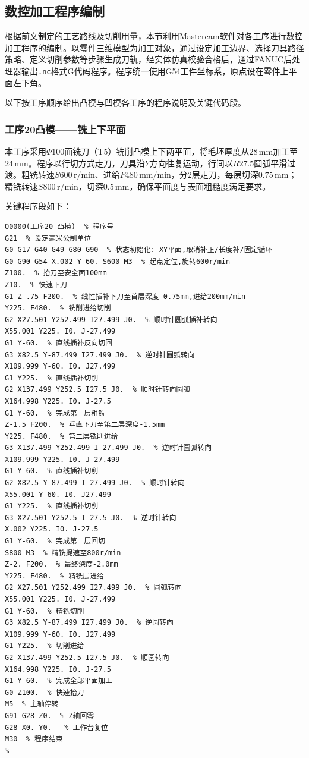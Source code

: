 \documentclass{xautCADreport}
\begin{document}
\subsection{数控加工程序编制}

根据前文制定的工艺路线及切削用量，本节利用Mastercam软件对各工序进行数控加工程序的编制。以零件三维模型为加工对象，通过设定加工边界、选择刀具路径策略、定义切削参数等步骤生成刀轨，经实体仿真校验合格后，通过FANUC后处理器输出\texttt{.nc}格式G代码程序。程序统一使用G54工件坐标系，原点设在零件上平面左下角。

以下按工序顺序给出凸模与凹模各工序的程序说明及关键代码段。

\subsubsection{工序20凸模——铣上下平面}

本工序采用$\Phi100$面铣刀（T5）铣削凸模上下两平面，将毛坯厚度从$28\,\mathrm{mm}$加工至$24\,\mathrm{mm}$。程序以行切方式走刀，刀具沿$Y$方向往复运动，行间以$R27.5$圆弧平滑过渡。粗铣转速$S600\,\mathrm{r/min}$、进给$F480\,\mathrm{mm/min}$，分2层走刀，每层切深$0.75\,\mathrm{mm}$；精铣转速$S800\,\mathrm{r/min}$，切深$0.5\,\mathrm{mm}$，确保平面度与表面粗糙度满足要求。

关键程序段如下：

\begin{lstlisting}[caption={工序20凸模铣平面程序（完整程序）}]
%
O0000(工序20-凸模)  % 程序号
G21  % 设定毫米公制单位
G0 G17 G40 G49 G80 G90  % 状态初始化: XY平面,取消补正/长度补/固定循环
G0 G90 G54 X.002 Y-60. S600 M3  % 起点定位,旋转600r/min
Z100.  % 抬刀至安全面100mm
Z10.  % 快速下刀
G1 Z-.75 F200.  % 线性插补下刀至首层深度-0.75mm,进给200mm/min
Y225. F480.  % 铣削进给切削
G2 X27.501 Y252.499 I27.499 J0.  % 顺时针圆弧插补转向
X55.001 Y225. I0. J-27.499
G1 Y-60.  % 直线插补反向切回
G3 X82.5 Y-87.499 I27.499 J0.  % 逆时针圆弧转向
X109.999 Y-60. I0. J27.499
G1 Y225.  % 直线插补切削
G2 X137.499 Y252.5 I27.5 J0.  % 顺时针转向圆弧
X164.998 Y225. I0. J-27.5
G1 Y-60.  % 完成第一层粗铣
Z-1.5 F200.  % 垂直下刀至第二层深度-1.5mm
Y225. F480.  % 第二层铣削进给
G3 X137.499 Y252.499 I-27.499 J0.  % 逆时针圆弧转向
X109.999 Y225. I0. J-27.499
G1 Y-60.  % 直线插补切削
G2 X82.5 Y-87.499 I-27.499 J0.  % 顺时针转向
X55.001 Y-60. I0. J27.499
G1 Y225.  % 直线插补切削
G3 X27.501 Y252.5 I-27.5 J0.  % 逆时针转向
X.002 Y225. I0. J-27.5
G1 Y-60.  % 完成第二层回切
S800 M3  % 精铣提速至800r/min
Z-2. F200.  % 最终深度-2.0mm
Y225. F480.  % 精铣层进给
G2 X27.501 Y252.499 I27.499 J0.  % 圆弧转向
X55.001 Y225. I0. J-27.499
G1 Y-60.  % 精铣切削
G3 X82.5 Y-87.499 I27.499 J0.  % 逆圆转向
X109.999 Y-60. I0. J27.499
G1 Y225.  % 切削进给
G2 X137.499 Y252.5 I27.5 J0.  % 顺圆转向
X164.998 Y225. I0. J-27.5
G1 Y-60.  % 完成全部平面加工
G0 Z100.  % 快速抬刀
M5  % 主轴停转
G91 G28 Z0.  % Z轴回零
G28 X0. Y0.   % 工作台复位
M30  % 程序结束
%
\end{lstlisting}
\end{document}
